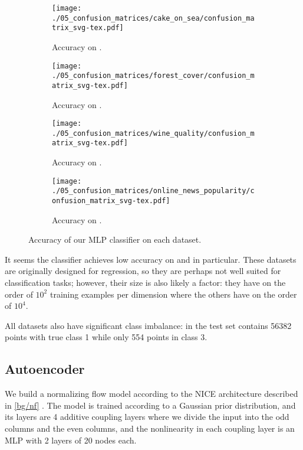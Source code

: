 \documentclass[../main.tex]{subfiles}
\begin{document}
\begin{figure}
    \centering
    \begin{subfigure}[b]{0.4\textwidth}
        \centering
\texttt{[image: ./05\_confusion\_matrices/cake\_on\_sea/confusion\_matrix\_svg-tex.pdf]}
        \caption{Accuracy on \CakeOnSea.}
\label{fig:cos_confusion_matrix}
    \end{subfigure}
    \begin{subfigure}[b]{0.4\textwidth}
        \centering
\texttt{[image: ./05\_confusion\_matrices/forest\_cover/confusion\_matrix\_svg-tex.pdf]}
        \caption{Accuracy on \ForestCover.}
    \end{subfigure}

    \begin{subfigure}[b]{0.4\textwidth}
        \centering
\texttt{[image: ./05\_confusion\_matrices/wine\_quality/confusion\_matrix\_svg-tex.pdf]}
        \caption{Accuracy on \WineQuality.}
    \end{subfigure}
    \begin{subfigure}[b]{0.4\textwidth}
        \centering
\texttt{[image: ./05\_confusion\_matrices/online\_news\_popularity/confusion\_matrix\_svg-tex.pdf]}
        \caption{Accuracy on \OnlineNewsPopularity.}
    \end{subfigure}

    \caption{Accuracy of our MLP classifier on each dataset.}
    \label{fig:confusion_matrices}
\end{figure}

It seems the classifier achieves low accuracy on \WineQuality{} and \OnlineNewsPopularity{} in particular.
These datasets are originally designed for regression, so they are perhaps not well suited for classification tasks; however, their size is also likely a factor: they have on the order of $10^2$ training examples per dimension where the others have on the order of $10^4$.

All datasets also have significant class imbalance: in \ForestCover{} the test set contains 56382 points with true class 1 while only 554 points in class 3.

\subsection{Autoencoder}

We build a normalizing flow model according to the NICE architecture described in \autoref{bg/nf} \cite{dinhNICE2015}.
The model is trained according to a Gaussian prior distribution, and its layers are 4 additive coupling layers where we divide the input into the odd columns and the even columns, and the nonlinearity in each coupling layer is an MLP with 2 layers of 20 nodes each.
\end{document}
